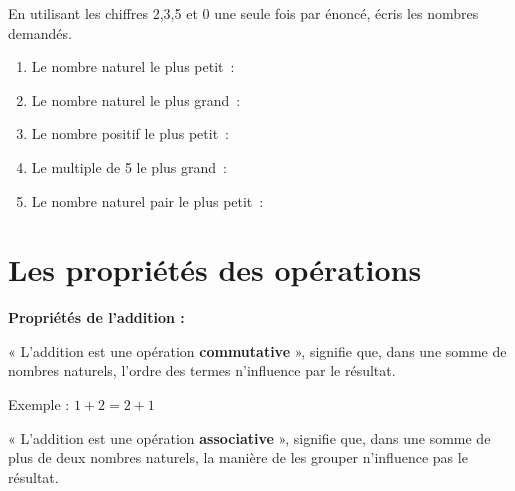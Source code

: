 \documentclass[../../syllabus_1.tex]{subfiles}
\begin{document}
\begin{exercise}
    En utilisant les chiffres 2,3,5 et 0 une seule fois par énoncé, écris les nombres demandés.
\end{exercise}

\begin{enumerate}[itemsep=2em]
    \item Le nombre naturel le plus petit~:
    \item Le nombre naturel le plus grand~:
    \item Le nombre positif le plus petit~:
    \item Le multiple de 5 le plus grand~:
    \item Le nombre naturel pair le plus petit~:
\end{enumerate}

\newpage

\section{Les propriétés des opérations}


\textbf{Propriétés de l'addition :}

« L'addition est une opération \textbf{commutative} », signifie que, dans une somme de nombres naturels, l'ordre des termes n'influence par le résultat.

Exemple : \(1 + 2 = 2 + 1 \)

« L'addition est une opération \textbf{associative} », signifie que, dans une somme de plus de deux nombres naturels, la manière de les grouper n'influence pas le résultat.
\end{document}
